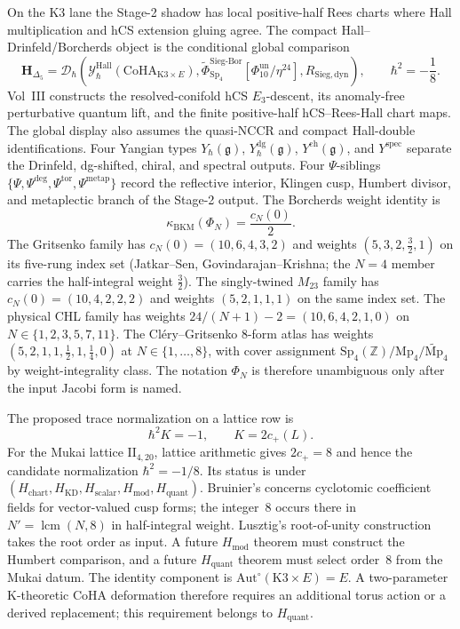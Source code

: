 On the K3 lane the Stage-2 shadow has local positive-half Rees charts
where Hall multiplication and hCS extension gluing agree. The compact
Hall--Drinfeld/Borcherds object is the conditional global comparison
\[
 \mathbf H_{\Delta_5}
 =\mathcal D_\hbar\!\left(
 \mathcal Y^{\mathrm{Hall}}_\hbar(\mathrm{CoHA}_{\mathrm{K3}\times E}),
 \widetilde\Phi_{\mathrm{Sp}_4}^{\mathrm{Sieg\text{-}Bor}}
 [\Phi_{10}^{\mathrm{un}}/\eta^{24}],
 R_{\mathrm{Sieg,dyn}}\right),
 \qquad \hbar^2=-\frac18.
\]
Vol~III constructs the resolved-conifold hCS \(E_3\)-descent, its
anomaly-free perturbative quantum lift, and the finite positive-half
hCS--Rees-Hall chart maps. The global display also assumes the
quasi-NCCR and compact Hall-double identifications.
Four Yangian types
$Y_\hbar(\mathfrak g)$, $Y_\hbar^{\mathrm{dg}}(\mathfrak g)$,
$Y^{\mathrm{ch}}(\mathfrak g)$, and $Y^{\mathrm{spec}}$ separate the
Drinfeld, dg-shifted, chiral, and spectral outputs. Four
$\Psi$-siblings
$\{\Psi,\Psi^{\deg},\Psi^{\mathrm{tor}},\Psi^{\mathrm{metap}}\}$
record the reflective interior, Klingen cusp, Humbert divisor, and
metaplectic branch of the Stage-2 output.
The Borcherds weight identity is
\[
 \kappa_{\mathrm{BKM}}(\Phi_N)=\frac{c_N(0)}2.
\]
The Gritsenko family has
$c_N(0)=(10,6,4,3,2)$ and weights $(5,3,2,\tfrac32,1)$ on its
five-rung index set \textup{(}Jatkar--Sen,
Govindarajan--Krishna; the $N=4$ member carries the half-integral
weight $\tfrac32$\textup{)}. The singly-twined $M_{23}$ family has
$c_N(0)=(10,4,2,2,2)$ and weights $(5,2,1,1,1)$ on the same index
set. The physical CHL family has weights
$24/(N+1)-2=(10,6,4,2,1,0)$ on
$N\in\{1,2,3,5,7,11\}$. The Cl\'ery--Gritsenko 8-form atlas has weights
$(5,2,1,1,\tfrac12,1,\tfrac14,0)$ at $N\in\{1,\ldots,8\}$, with cover
assignment
$\mathrm{Sp}_4(\mathbb Z)/\mathrm{Mp}_4/\widetilde{\mathrm{Mp}}_4$ by
weight-integrality class. The notation $\Phi_N$ is therefore
unambiguous only after the input Jacobi form is named.

The proposed trace normalization on a lattice row is
\[
 \hbar^2K=-1,\qquad K=2c_+(L).
\]
For the Mukai lattice $\mathrm{II}_{4,20}$, lattice arithmetic gives
$2c_+=8$ and hence the candidate normalization $\hbar^2=-1/8$.
Its status is \ClaimStatusConjectured{} under
$(H_{\mathrm{chart}},H_{\mathrm{KD}},H_{\mathrm{scalar}},
H_{\mathrm{mod}},H_{\mathrm{quant}})$.  Bruinier's
\cite[Lemma~5.1]{Bruinier2002} concerns cyclotomic coefficient fields
for vector-valued cusp forms; the integer~$8$ occurs there in
$N'=\operatorname{lcm}(N,8)$ in half-integral weight.  Lusztig's
root-of-unity construction takes the root order as input.  A future
$H_{\mathrm{mod}}$ theorem must construct the Humbert comparison, and
a future $H_{\mathrm{quant}}$ theorem must select order~$8$ from the
Mukai datum.  The identity component is
$\mathrm{Aut}^\circ(\mathrm{K3}\times E)=E$.  A two-parameter
K-theoretic CoHA deformation therefore requires an additional torus
action or a derived replacement; this requirement belongs to
$H_{\mathrm{quant}}$.

